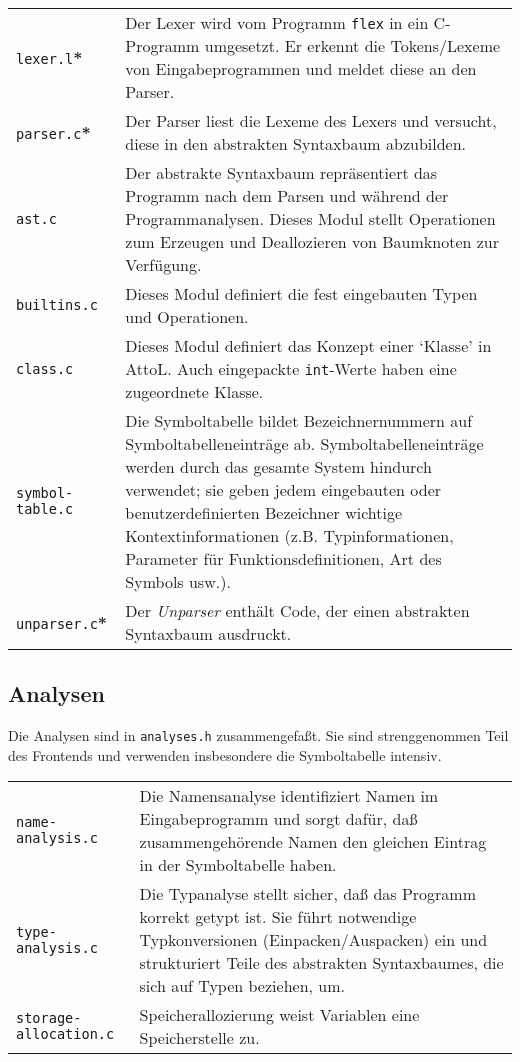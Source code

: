 \documentclass[11pt,a4paper]{article}
\begin{document}
\begin{tabular}{p{4cm}p{12cm}}
\texttt{lexer.l}\textbf{*} & Der Lexer wird vom Programm \texttt{flex} in ein C-Programm umgesetzt.  Er erkennt die Tokens/Lexeme von
Eingabeprogrammen und meldet diese an den Parser. \\
\texttt{parser.c}\textbf{*} & Der Parser liest die Lexeme des Lexers und versucht, diese in den abstrakten Syntaxbaum abzubilden. \\
\texttt{ast.c} & Der abstrakte Syntaxbaum repräsentiert das Programm nach dem Parsen und während der Programmanalysen.  Dieses Modul stellt Operationen zum Erzeugen
und Deallozieren von Baumknoten zur Verfügung.
\\
\texttt{builtins.c} & Dieses Modul definiert die fest eingebauten Typen und Operationen. \\
\texttt{class.c} & Dieses Modul definiert das Konzept einer `Klasse' in AttoL.  Auch eingepackte \texttt{int}-Werte haben eine zugeordnete Klasse. \\
\texttt{symbol-table.c} & Die Symboltabelle bildet Bezeichnernummern auf Symboltabelleneinträge ab.  Symboltabelleneinträge werden durch
das gesamte System hindurch verwendet; sie geben jedem eingebauten oder benutzerdefinierten Bezeichner wichtige Kontextinformationen (z.B. Typinformationen, Parameter für Funktionsdefinitionen, Art des Symbols usw.). \\
\texttt{unparser.c}\textbf{*} & Der \emph{Unparser} enthält Code, der einen abstrakten Syntaxbaum ausdruckt.\\
\end{tabular}

\subsection{Analysen}

Die Analysen sind in \texttt{analyses.h} zusammengefaßt.  Sie sind
strenggenommen Teil des Frontends und verwenden insbesondere die
Symboltabelle intensiv.

\begin{tabular}{p{4cm}p{12cm}}
\texttt{name-analysis.c} & Die Namensanalyse identifiziert Namen im Eingabeprogramm und sorgt dafür, daß zusammengehörende Namen den gleichen Eintrag in der Symboltabelle haben.\\
\texttt{type-analysis.c} & Die Typanalyse stellt sicher, daß das Programm korrekt getypt ist.  Sie führt notwendige Typkonversionen (Einpacken/Auspacken) ein und
strukturiert Teile des abstrakten Syntaxbaumes, die sich auf Typen beziehen, um. \\
\texttt{storage-allocation.c} & Speicherallozierung weist Variablen eine Speicherstelle zu. \\
\end{tabular}
\end{document}
